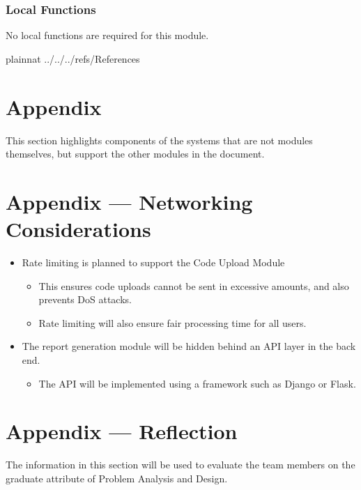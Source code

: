 \documentclass[12pt, titlepage]{article}
\begin{document}
\subsubsection{Local Functions}
No local functions are required for this module.

\newpage

 {plainnat}
 {../../../refs/References}

\newpage

\section{Appendix} \label{Appendix}
This section highlights components of the systems that are not modules themselves, but support the other modules in the document.

\section*{Appendix --- Networking Considerations}
\begin{itemize}
    \item Rate limiting is planned to support the Code Upload Module
    \begin{itemize}
        \item This ensures code uploads cannot be sent in excessive amounts, and also prevents DoS attacks.
        \item Rate limiting will also ensure fair processing time for all users.
    \end{itemize}
    \item The report generation module will be hidden behind an API layer in the back end.
    \begin{itemize}
        \item The API will be implemented using a framework such as Django or Flask.
    \end{itemize}
\end{itemize}

\section*{Appendix --- Reflection}

The information in this section will be used to evaluate the team members on the
graduate attribute of Problem Analysis and Design.


\end{document}
